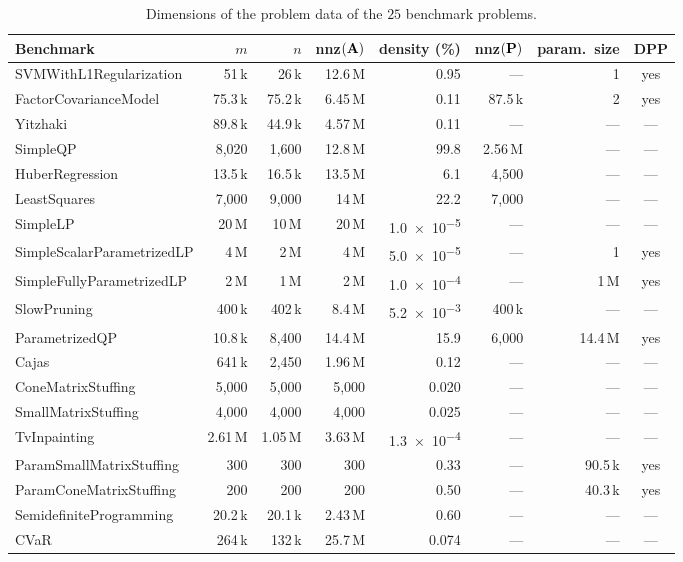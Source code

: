 \begin{table}[htbp]
\centering
\caption[Dimensions of the benchmark problems]{Dimensions of the problem data of the $25$
benchmark problems.}\label{tab:instances}
{\small
\setlength{\tabcolsep}{4pt}
\begin{tabular}{l rrrr rrc}
\toprule
Benchmark & $m$ & $n$ & nnz$(\mathbf{A})$ & density (\%) & nnz$(\mathbf{P})$ & param.\ size & \ac{DPP} \\
\midrule
SVMWithL1Regularization & 51\,k & 26\,k & 12.6\,M & 0.95 & --- & 1 & yes \\
FactorCovarianceModel & 75.3\,k & 75.2\,k & 6.45\,M & 0.11 & 87.5\,k & 2 & yes \\
Yitzhaki & 89.8\,k & 44.9\,k & 4.57\,M & 0.11 & --- & --- & --- \\
SimpleQP & 8{,}020 & 1{,}600 & 12.8\,M & 99.8 & 2.56\,M & --- & --- \\
HuberRegression & 13.5\,k & 16.5\,k & 13.5\,M & 6.1 & 4{,}500 & --- & --- \\
LeastSquares & 7{,}000 & 9{,}000 & 14\,M & 22.2 & 7{,}000 & --- & --- \\
SimpleLP & 20\,M & 10\,M & 20\,M & \num{1.0e-5} & --- & --- & --- \\
SimpleScalarParametrizedLP & 4\,M & 2\,M & 4\,M & \num{5.0e-5} & --- & 1 & yes \\
SimpleFullyParametrizedLP & 2\,M & 1\,M & 2\,M & \num{1.0e-4} & --- & 1\,M & yes \\
SlowPruning & 400\,k & 402\,k & 8.4\,M & \num{5.2e-3} & 400\,k & --- & --- \\
ParametrizedQP & 10.8\,k & 8{,}400 & 14.4\,M & 15.9 & 6{,}000 & 14.4\,M & yes \\
Cajas & 641\,k & 2{,}450 & 1.96\,M & 0.12 & --- & --- & --- \\
ConeMatrixStuffing & 5{,}000 & 5{,}000 & 5{,}000 & 0.020 & --- & --- & --- \\
SmallMatrixStuffing & 4{,}000 & 4{,}000 & 4{,}000 & 0.025 & --- & --- & --- \\
TvInpainting & 2.61\,M & 1.05\,M & 3.63\,M & \num{1.3e-4} & --- & --- & --- \\
ParamSmallMatrixStuffing & 300 & 300 & 300 & 0.33 & --- & 90.5\,k & yes \\
ParamConeMatrixStuffing & 200 & 200 & 200 & 0.50 & --- & 40.3\,k & yes \\
SemidefiniteProgramming & 20.2\,k & 20.1\,k & 2.43\,M & 0.60 & --- & --- & --- \\
CVaR & 264\,k & 132\,k & 25.7\,M & 0.074 & --- & --- & --- \\

\end{tabular}}
\end{table}
